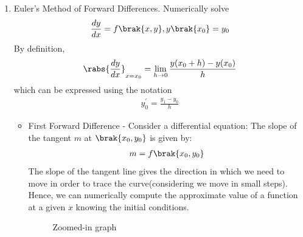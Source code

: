 \begin{enumerate}[label=\thesubsection.\arabic*, ref=\thesubsection.\theenumi]
\begin{align}
	    &=\frac{s\beta}{s^2 + \alpha^2}+\frac{\gamma}{s^2 + \alpha^2}
\end{align}
yielding
\begin{align}
	y(t)=\beta \cos(\alpha t) + \frac{\gamma}{\alpha}\sin(\alpha t) \label{eq:EE26BTECH11202-Laplace_7}
\end{align}
from \eqref{eq:EE26BTECH11202-Laplace_5}.
\item Euler's Method of Forward Differences.  Numerically solve 
\begin{align}
	\frac{dy}{dx}=f\brak{x,y}, y\brak{x_0}=y_0
\end{align}
\solution By definition,
\begin{align}
	\rabs{\frac{dy}{dx}}_{x = x_0}= \lim_{h \to 0}\frac{y(x_0+h)-y(x_0)}{h}
\end{align}
which can be expressed using the notation
\begin{align}
	y^{\prime}_0=\frac{y_{1}-y_0}{h} \label{eq:EE26BTECH11202-ED_1}
\end{align}
\iffalse
\begin{itemize}
	\item First Forward Difference - Consider a differential equation:
The slope of the tangent $m$ at $\brak{x_0, y_0}$ is given by:
\begin{align}
m=f\brak{x_0,y_0}
\end{align}
The slope of the tangent line gives the direction in which we need to move in order to trace the curve(considering we move in small steps). Hence, we can numerically compute the approximate value of a function at a given $x$ knowing the initial conditions. 
\begin{figure}[H]
\begin{center}

    \caption{Zoomed-in graph}
    \label{fig:1}


\end{center}
\end{figure}
\end{itemize}
\end{enumerate}

